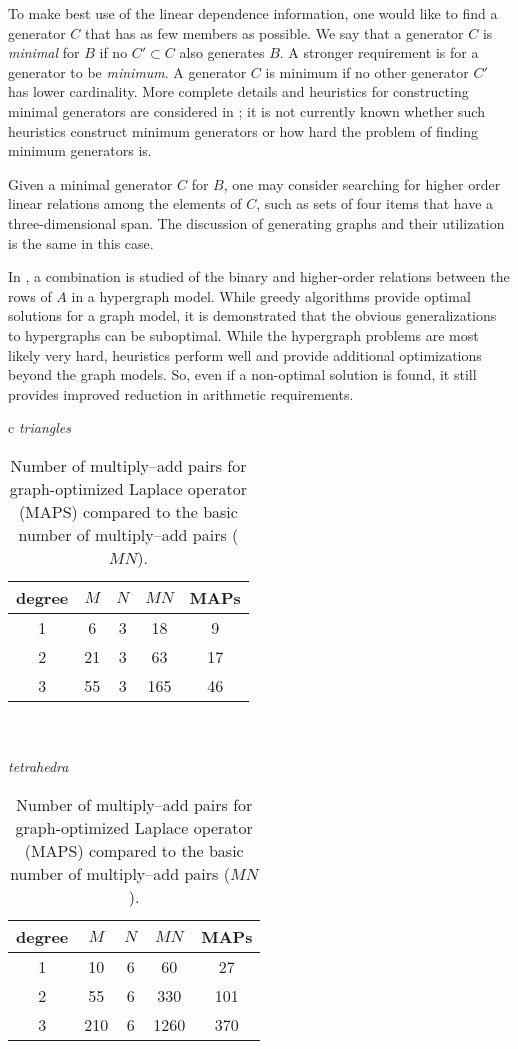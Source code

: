 To make best use of the linear dependence information, one would like
to find a generator $C$ that has as few members as possible.  We
say that a generator $C$ is \emph{minimal} for $B$ if no $C'
\subset C$ also generates $B$. A stronger requirement is for a
generator to be \emph{minimum}. A generator $C$ is minimum if no other
generator $C'$ has lower cardinality.  More complete details and
heuristics for constructing minimal generators are considered
in \citet{KirbyScott2007}; it is not currently known whether such
heuristics construct minimum generators or how hard the problem of
finding minimum generators is.

Given a minimal generator $C$ for $B$, one may consider searching for
higher order linear relations among the elements of $C$, such as sets
of four items that have a three-dimensional span.  The discussion of
generating graphs and their utilization is the same in this case.

In \citet{WolfHeath2009}, a combination is studied of the binary and
higher-order relations between the rows of $A$ in a hypergraph model.
While greedy algorithms provide optimal solutions for a graph model,
it is demonstrated that the obvious generalizations to hypergraphs can
be suboptimal. While the hypergraph problems are most likely very
hard, heuristics perform well and provide additional optimizations
beyond the graph models. So, even if a non-optimal solution is found,
it still provides improved reduction in arithmetic requirements.

\begin{table}
  \begin{center}
    \begin{tabular}{c}
      \emph{triangles} \\
      \begin{tabular}{|c|ccc|c|}\hline
        degree & $M$ & $N$ & $MN$ & MAPs \\
        \hline
        \hline
        1 &6 &3& 18& 9 \\
        2 &21& 3& 63& 17\\
        3 &55& 3& 165& 46 \\\hline
      \end{tabular}
      \\
      \\
      \emph{tetrahedra} \\
      \begin{tabular}{|c|ccc|c|}\hline
        degree & $M$ & $N$ & $MN$ & MAPs \\
        \hline
        \hline
        1 & 10 & 6 &60 &27 \\
        2 & 55 & 6 & 330 &101 \\
        3 & 210 &6 &1260 &370 \\\hline
      \end{tabular}
    \end{tabular}
    \label{tab:kirby-4:graph}
    \caption{Number of multiply--add pairs for graph-optimized Laplace
      operator (MAPS) compared to the basic number of multiply--add pairs ($MN$).}
  \end{center}
\end{table}

